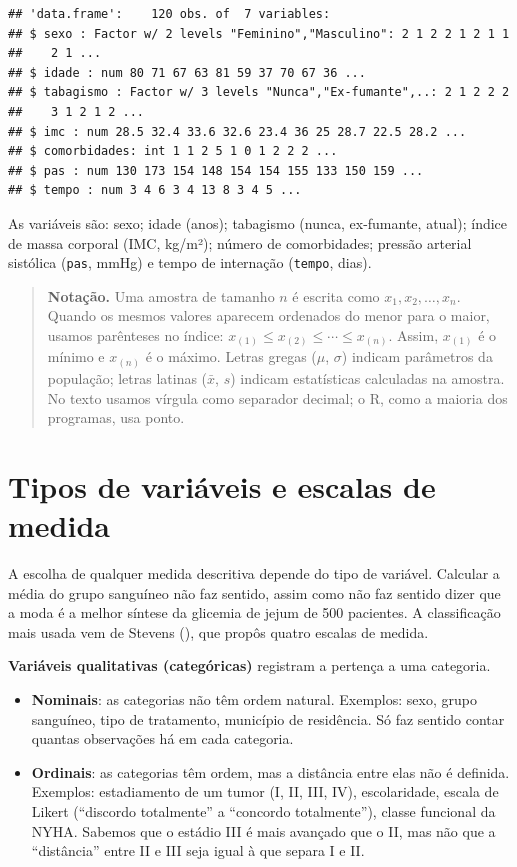 \documentclass[
]{book}
\providecommand{\tightlist}{%
  \setlength{\itemsep}{0pt}\setlength{\parskip}{0pt}}
\begin{document}
\begin{verbatim}
## 'data.frame':    120 obs. of  7 variables:
## $ sexo : Factor w/ 2 levels "Feminino","Masculino": 2 1 2 2 1 2 1 1
##    2 1 ...
## $ idade : num 80 71 67 63 81 59 37 70 67 36 ...
## $ tabagismo : Factor w/ 3 levels "Nunca","Ex-fumante",..: 2 1 2 2 2
##    3 1 2 1 2 ...
## $ imc : num 28.5 32.4 33.6 32.6 23.4 36 25 28.7 22.5 28.2 ...
## $ comorbidades: int 1 1 2 5 1 0 1 2 2 2 ...
## $ pas : num 130 173 154 148 154 154 155 133 150 159 ...
## $ tempo : num 3 4 6 3 4 13 8 3 4 5 ...
\end{verbatim}

As variáveis são: sexo; idade (anos); tabagismo (nunca, ex-fumante, atual); índice de massa corporal (IMC, kg/m²); número de comorbidades; pressão arterial sistólica (\texttt{pas}, mmHg) e tempo de internação (\texttt{tempo}, dias).

\begin{quote}
\textbf{Notação.} Uma amostra de tamanho \(n\) é escrita como \(x_1, x_2, \ldots, x_n\). Quando os mesmos valores aparecem ordenados do menor para o maior, usamos parênteses no índice: \(x_{(1)} \le x_{(2)} \le \cdots \le x_{(n)}\). Assim, \(x_{(1)}\) é o mínimo e \(x_{(n)}\) é o máximo. Letras gregas (\(\mu\), \(\sigma\)) indicam parâmetros da população; letras latinas (\(\bar{x}\), \(s\)) indicam estatísticas calculadas na amostra. No texto usamos vírgula como separador decimal; o R, como a maioria dos programas, usa ponto.
\end{quote}

\section{Tipos de variáveis e escalas de medida}\label{desc-tipos}

A escolha de qualquer medida descritiva depende do tipo de variável. Calcular a média do grupo sanguíneo não faz sentido, assim como não faz sentido dizer que a moda é a melhor síntese da glicemia de jejum de 500 pacientes. A classificação mais usada vem de Stevens (), que propôs quatro escalas de medida.

\textbf{Variáveis qualitativas (categóricas)} registram a pertença a uma categoria.

\begin{itemize}
\tightlist
\item
  \textbf{Nominais}: as categorias não têm ordem natural. Exemplos: sexo, grupo sanguíneo, tipo de tratamento, município de residência. Só faz sentido contar quantas observações há em cada categoria.
\item
  \textbf{Ordinais}: as categorias têm ordem, mas a distância entre elas não é definida. Exemplos: estadiamento de um tumor (I, II, III, IV), escolaridade, escala de Likert (``discordo totalmente'' a ``concordo totalmente''), classe funcional da NYHA. Sabemos que o estádio III é mais avançado que o II, mas não que a ``distância'' entre II e III seja igual à que separa I e II.
\end{itemize}
\end{document}
